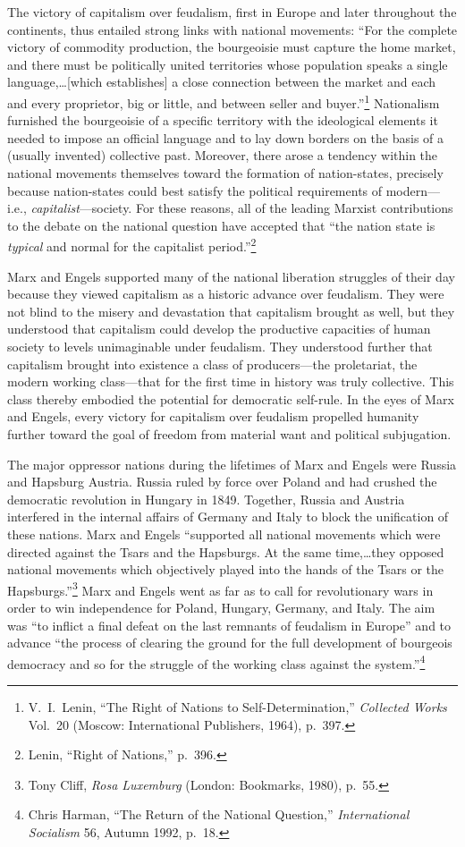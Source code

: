 The victory of capitalism over feudalism, first in Europe and later throughout the continents, thus entailed strong links with national movements: ``For the complete victory of commodity production, the bourgeoisie must capture the home market, and there must be politically united territories whose population speaks a single language,\ldots [which establishes] a close connection between the market and each and every proprietor, big or little, and between seller and buyer.''\footnote{V.\ I.\ Lenin, ``The Right of Nations to Self-Determination,'' \emph{Collected Works} Vol.\ 20 (Moscow: International Publishers, 1964), p.\ 397.} Nationalism furnished the bourgeoisie of a specific territory with the ideological elements it needed to impose an official language and to lay down borders on the basis of a (usually invented) collective past. Moreover, there arose a tendency within the national movements themselves toward the formation of nation-states, precisely because nation-states could best satisfy the political requirements of modern---i.e., \emph{capitalist}---society. For these reasons, all of the leading Marxist contributions to the debate on the national question have accepted that ``the nation state is \emph{typical} and normal for the capitalist period.''\footnote{Lenin, ``Right of Nations,'' p.\ 396.}

Marx and Engels supported many of the national liberation struggles of their day because they viewed capitalism as a historic advance over feudalism. They were not blind to the misery and devastation that capitalism brought as well, but they understood that capitalism could develop the productive capacities of human society to levels unimaginable under feudalism. They understood further that capitalism brought into existence a class of producers---the proletariat, the modern working class---that for the first time in history was truly collective. This class thereby embodied the potential for democratic self-rule. In the eyes of Marx and Engels, every victory for capitalism over feudalism propelled humanity further toward the goal of freedom from material want and political subjugation.

The major oppressor nations during the lifetimes of Marx and Engels were Russia and Hapsburg Austria. Russia ruled by force over Poland and had crushed the democratic revolution in Hungary in 1849. Together, Russia and Austria interfered in the internal affairs of Germany and Italy to block the unification of these nations. Marx and Engels ``supported all national movements which were directed against the Tsars and the Hapsburgs. At the same time,\ldots they opposed national movements which objectively played into the hands of the Tsars or the Hapsburgs.''\footnote{Tony Cliff, \emph{Rosa Luxemburg} (London: Bookmarks, 1980), p.\ 55.} Marx and Engels went as far as to call for revolutionary wars in order to win independence for Poland, Hungary, Germany, and Italy. The aim was ``to inflict a final defeat on the last remnants of feudalism in Europe'' and to advance ``the process of clearing the ground for the full development of bourgeois democracy and so for the struggle of the working class against the system.''\footnote{Chris Harman, ``The Return of the National Question,'' \emph{International Socialism} 56, Autumn 1992, p.\ 18.}


